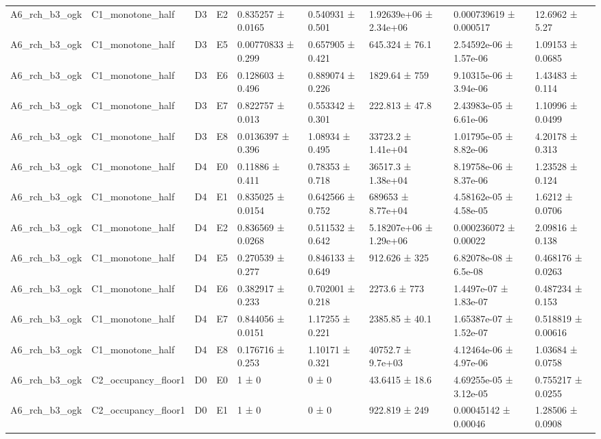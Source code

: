 \begin{table}
\begin{tabular}{lllllllll}
A6\_rch\_b3\_ogk & C1\_monotone\_half & D3 & E2 & 0.835257 ± 0.0165 & 0.540931 ± 0.501 & 1.92639e+06 ± 2.34e+06 & 0.000739619 ± 0.000517 & 12.6962 ± 5.27 \\
A6\_rch\_b3\_ogk & C1\_monotone\_half & D3 & E5 & 0.00770833 ± 0.299 & 0.657905 ± 0.421 & 645.324 ± 76.1 & 2.54592e-06 ± 1.57e-06 & 1.09153 ± 0.0685 \\
A6\_rch\_b3\_ogk & C1\_monotone\_half & D3 & E6 & 0.128603 ± 0.496 & 0.889074 ± 0.226 & 1829.64 ± 759 & 9.10315e-06 ± 3.94e-06 & 1.43483 ± 0.114 \\
A6\_rch\_b3\_ogk & C1\_monotone\_half & D3 & E7 & 0.822757 ± 0.013 & 0.553342 ± 0.301 & 222.813 ± 47.8 & 2.43983e-05 ± 6.61e-06 & 1.10996 ± 0.0499 \\
A6\_rch\_b3\_ogk & C1\_monotone\_half & D3 & E8 & 0.0136397 ± 0.396 & 1.08934 ± 0.495 & 33723.2 ± 1.41e+04 & 1.01795e-05 ± 8.82e-06 & 4.20178 ± 0.313 \\
A6\_rch\_b3\_ogk & C1\_monotone\_half & D4 & E0 & 0.11886 ± 0.411 & 0.78353 ± 0.718 & 36517.3 ± 1.38e+04 & 8.19758e-06 ± 8.37e-06 & 1.23528 ± 0.124 \\
A6\_rch\_b3\_ogk & C1\_monotone\_half & D4 & E1 & 0.835025 ± 0.0154 & 0.642566 ± 0.752 & 689653 ± 8.77e+04 & 4.58162e-05 ± 4.58e-05 & 1.6212 ± 0.0706 \\
A6\_rch\_b3\_ogk & C1\_monotone\_half & D4 & E2 & 0.836569 ± 0.0268 & 0.511532 ± 0.642 & 5.18207e+06 ± 1.29e+06 & 0.000236072 ± 0.00022 & 2.09816 ± 0.138 \\
A6\_rch\_b3\_ogk & C1\_monotone\_half & D4 & E5 & 0.270539 ± 0.277 & 0.846133 ± 0.649 & 912.626 ± 325 & 6.82078e-08 ± 6.5e-08 & 0.468176 ± 0.0263 \\
A6\_rch\_b3\_ogk & C1\_monotone\_half & D4 & E6 & 0.382917 ± 0.233 & 0.702001 ± 0.218 & 2273.6 ± 773 & 1.4497e-07 ± 1.83e-07 & 0.487234 ± 0.153 \\
A6\_rch\_b3\_ogk & C1\_monotone\_half & D4 & E7 & 0.844056 ± 0.0151 & 1.17255 ± 0.221 & 2385.85 ± 40.1 & 1.65387e-07 ± 1.52e-07 & 0.518819 ± 0.00616 \\
A6\_rch\_b3\_ogk & C1\_monotone\_half & D4 & E8 & 0.176716 ± 0.253 & 1.10171 ± 0.321 & 40752.7 ± 9.7e+03 & 4.12464e-06 ± 4.97e-06 & 1.03684 ± 0.0758 \\
A6\_rch\_b3\_ogk & C2\_occupancy\_floor1 & D0 & E0 & 1 ± 0 & 0 ± 0 & 43.6415 ± 18.6 & 4.69255e-05 ± 3.12e-05 & 0.755217 ± 0.0255 \\
A6\_rch\_b3\_ogk & C2\_occupancy\_floor1 & D0 & E1 & 1 ± 0 & 0 ± 0 & 922.819 ± 249 & 0.00045142 ± 0.00046 & 1.28506 ± 0.0908 \\

\end{tabular}
\end{table}
